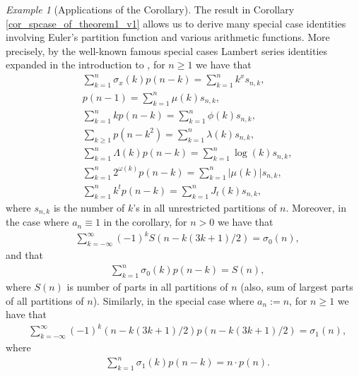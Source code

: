 \documentclass[10pt,reqno]{amsart}
\numberwithin{figure}{section}
\numberwithin{table}{section}
\theoremstyle{plain}
\numberwithin{theorem}{section}
\theoremstyle{remark}
\newtheorem{example}[theorem]{Example}
\begin{document}
\begin{example}[Applications of the Corollary] 
The result in Corollary \ref{cor_spcase_of_theorem1_v1} 
allows us to derive many special case identities involving Euler's partition function and various arithmetic functions. 
More precisely, by the well-known famous special cases Lambert series identities 
expanded in the introduction to \cite{MERCA-SCHMIDT1}, for $n \geq 1$ we have that 
	\begin{align*}
	& \sum_{k=1}^{n} \sigma_x(k) p(n-k) = \sum_{k=1}^n k^x s_{n,k},\\
	&  p(n-1) = \sum_{k=1}^{n} \mu(k) s_{n,k}, \\
	& \sum_{k=1}^{n} k p(n-k) = \sum_{k=1}^n \phi(k) s_{n,k},\\
	& \sum_{k\geq 1} p(n-k^2) = \sum_{k=1}^n \lambda(k) s_{n,k},\\
	& \sum_{k=1}^n \Lambda(k)p(n-k) = \sum_{k=1}^n \log(k) s_{n,k},\\
	& \sum_{k=1}^n 2^{\omega(k)} p(n-k) = \sum_{k=1}^n | \mu(k) | s_{n,k},\\
	& \sum_{k=1}^n k^t p(n-k) = \sum_{k=1}^n J_t(k) s_{n,k},
	\end{align*}
	where $s_{n,k}$ is the number of $k$'s in all unrestricted partitions of $n$. 
	Moreover, in the case where $a_n \equiv 1$ in the corollary, for $n > 0$ we have that 
	\begin{align*}
	& \sum_{k=-\infty}^{\infty} (-1)^k S(n-k(3k+1)/2) = \sigma_0(n), 
	\end{align*} 
	and that 
	\begin{align*} 
	& \sum_{k=1}^{n} \sigma_0(k) p(n-k) = S(n),
	\end{align*}
	where $S(n)$ is number of parts in all partitions of $n$ (also, sum of largest parts of all partitions of $n$).
	Similarly, in the special case where $a_n := n$, for $n \geq 1$ we have that 
	\begin{align*}
	& \sum_{k=-\infty}^{\infty} (-1)^k (n-k(3k+1)/2)p(n-k(3k+1)/2) = \sigma_1(n), 
	\end{align*} 
	where 
	\begin{align*} 
	& \sum_{k=1}^{n} \sigma_1(k) p(n-k) = n \cdot p(n).
	\end{align*}
\end{example}
\end{document}
